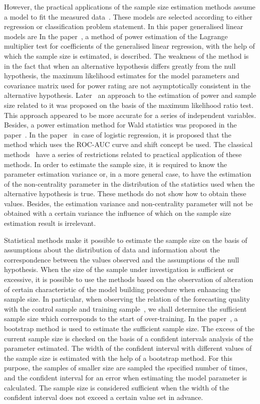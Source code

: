 \documentclass[
11pt,%
tightenlines,%
twoside,%
onecolumn,%
nofloats,%
nobibnotes,%
nofootinbib,%
superscriptaddress,%
noshowpacs,%
centertags]%
{revtex4}
\begin{document}
However, the practical applications of the sample size estimation methods assume a model to fit the measured data~\cite{kloek1975}. These models are selected according to either regression or classification problem statement. In this paper generalised linear models are  In the paper~\cite{self1988}, a method of power estimation of the Lagrange multiplier test for coefficients of the generalised linear regression, with the help of which the sample size is estimated, is described. The weakness of the method is in the fact that when an alternative hypothesis differs greatly from the null hypothesis, the maximum likelihood estimates for the model parameters and covariance matrix used for power rating are not asymptotically consistent in the alternative hypothesis. Later~\cite{self1992} an approach to the estimation of power and sample size related to it was proposed on the basis of the maximum likelihood ratio test. This approach appeared to be more accurate for a series of independent variables. Besides, a power estimation method for Wald statistics was proposed in the paper~\cite{shieh2005}. In the paper~\cite{motrenko2014} in case of logistic regression, it is proposed that the method which uses the ROC-AUC curve and shift concept be used. The classical methods~\cite{self1988, self1992, shieh2000, shieh2005} have a series of restrictions related to practical application of these methods. In order to estimate the sample size, it is required to know the parameter estimation variance or, in a more general case, to have the estimation of the non-centrality parameter in the distribution of the statistics used when the alternative hypothesis is true. These methods do not show how to obtain these values. Besides, the estimation variance and non-centrality parameter will not be obtained with a certain variance the influence of which on the sample size estimation result is irrelevant. 

Statistical methods make it possible to estimate the sample size on the basis of assumptions about the distribution of data and information about the correspondence between the values observed and the assumptions of the null hypothesis. When the size of the sample under investigation is sufficient or excessive, it is possible to use the methods based on the observation of alteration of certain characteristic of the model building procedure when enhancing the sample size. In particular, when observing the relation of the forecasting quality with the control sample and training sample~\cite{motrenko2014}, we shall determine the sufficient sample size which corresponds to the start of over-training. In the paper~\cite{qumsiyeh2013}, a bootstrap method is used to estimate the sufficient sample size. The excess of the current sample size is checked on the basis of a confident intervals analysis of the parameter estimated. The width of the confident interval with different values of the sample size is estimated with the help of a bootstrap method. For this purpose, the samples of smaller size are sampled the specified number of times, and the confident interval for an error when estimating the model parameter is calculated. The sample size is considered sufficient when the width of the confident interval does not exceed a certain value set in advance.
\end{document}
